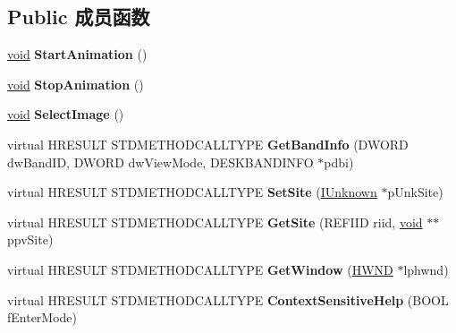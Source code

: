 \subsection*{Public 成员函数}
\begin{DoxyCompactItemize}
\item 
\mbox{\label{class_c_brand_band_af558db0eba4661a2b15e4f52dee2d23d}} 
\hyperlink{interfacevoid}{void} {\bfseries Start\+Animation} ()
\item 
\mbox{\label{class_c_brand_band_abf2623d4e0baef87727773d86f8ee6a5}} 
\hyperlink{interfacevoid}{void} {\bfseries Stop\+Animation} ()
\item 
\mbox{\label{class_c_brand_band_a527f692903fe278c5c593ab72436ac92}} 
\hyperlink{interfacevoid}{void} {\bfseries Select\+Image} ()
\item 
\mbox{\label{class_c_brand_band_abf3f99aebb0267b1be8499ae55b9ef80}} 
virtual H\+R\+E\+S\+U\+LT S\+T\+D\+M\+E\+T\+H\+O\+D\+C\+A\+L\+L\+T\+Y\+PE {\bfseries Get\+Band\+Info} (D\+W\+O\+RD dw\+Band\+ID, D\+W\+O\+RD dw\+View\+Mode, D\+E\+S\+K\+B\+A\+N\+D\+I\+N\+FO $\ast$pdbi)
\item 
\mbox{\label{class_c_brand_band_ace82c3be14500c24f44010ad1ef24219}} 
virtual H\+R\+E\+S\+U\+LT S\+T\+D\+M\+E\+T\+H\+O\+D\+C\+A\+L\+L\+T\+Y\+PE {\bfseries Set\+Site} (\hyperlink{interface_i_unknown}{I\+Unknown} $\ast$p\+Unk\+Site)
\item 
\mbox{\label{class_c_brand_band_ad13da79add177932860b85ee4e9d15f2}} 
virtual H\+R\+E\+S\+U\+LT S\+T\+D\+M\+E\+T\+H\+O\+D\+C\+A\+L\+L\+T\+Y\+PE {\bfseries Get\+Site} (R\+E\+F\+I\+ID riid, \hyperlink{interfacevoid}{void} $\ast$$\ast$ppv\+Site)
\item 
\mbox{\label{class_c_brand_band_a16bc7d99e15feba855f2369240dbb2ad}} 
virtual H\+R\+E\+S\+U\+LT S\+T\+D\+M\+E\+T\+H\+O\+D\+C\+A\+L\+L\+T\+Y\+PE {\bfseries Get\+Window} (\hyperlink{interfacevoid}{H\+W\+ND} $\ast$lphwnd)
\item 
\mbox{\label{class_c_brand_band_a4b9e82eb3332c0e6d95e9ced6f3ee843}} 
virtual H\+R\+E\+S\+U\+LT S\+T\+D\+M\+E\+T\+H\+O\+D\+C\+A\+L\+L\+T\+Y\+PE {\bfseries Context\+Sensitive\+Help} (B\+O\+OL f\+Enter\+Mode)
$$
\end{DoxyCompactItemize}
